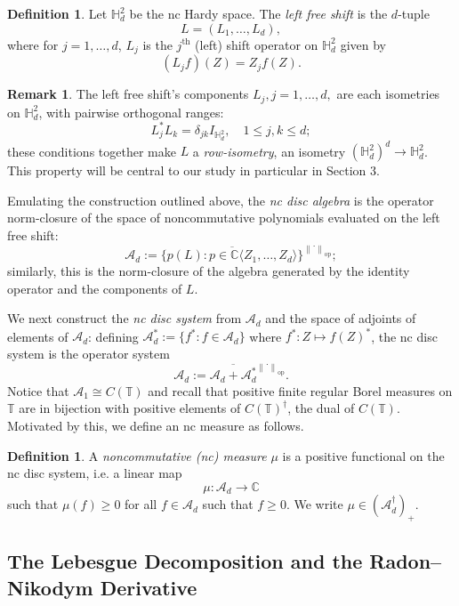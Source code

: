 \documentclass[11pt,reqno]{amsart}
\newcommand\norm[1]{\left\lVert#1\right\rVert}
\newcommand\ncm[1]{(\mathscr{A}_{#1}^{\dagger})_+}
\def\d{\delta}
\def\CC{\mathbb{C}}
\def\TT{\mathbb{T}}
\def\HH{\mathbb{H}}
\def\cA{\mathcal{A}}
\def\scrA{\mathscr{A}}
\theoremstyle{definition}
\newtheorem{definition}[theorem]{Definition}
\newtheorem{remark}[theorem]{Remark}
\numberwithin{equation}{section}
\begin{document}
\begin{definition}
    \label{def:LeftShift}
    Let \(\HH^2_d\) be the nc Hardy space. The \emph{left free shift} is the \(d\)-tuple
    \[
        L = (L_1, \ldots, L_d),
    \]
    where for \(j = 1, \ldots, d\), \(L_j\) is the \(j^{\text{th}}\) (left) shift operator on \(\HH^2_d\) given by
    \[
        (L_j f)(Z) = Z_j f(Z).
    \]
\end{definition}

\begin{remark}
    The left free shift's components \(L_j, j = 1, \ldots, d,\) are each isometries on \(\HH_d^2\), with pairwise orthogonal ranges:
    \[
        L_j^* L_k = \d_{jk} I_{\HH^2_d}, \quad 1 \leq j,k \leq d;
    \]
    these conditions together make \(L\) a \emph{row-isometry}, an isometry \((\HH^2_d)^d \to \HH^2_d\). This property will be central to our study in particular in Section 3.
\end{remark}

Emulating the construction outlined above, the \emph{nc disc algebra} is the operator norm-closure of the space of noncommutative polynomials evaluated on the left free shift:
\[
    \cA_d := \overline{\{p(L) : p \in \CC\langle Z_1, \ldots, Z_d \rangle\}}^{\norm{\cdot}_{\mathrm{op}}};
\]
similarly, this is the norm-closure of the algebra generated by the identity operator and the components of \(L\).

We next construct the \emph{nc disc system} from \(\cA_d\) and the space of adjoints of elements of \(\cA_d\): defining \(\cA_d^* := \{f^* : f \in \cA_d\}\) where \(f^* : Z \mapsto f(Z)^*\), the nc disc system is the operator system
\[
    \scrA_d := \overline{\cA_d + \cA_d^*}^{\norm{\cdot}_{\mathrm{op}}}.
\]
Notice that \(\scrA_1 \cong C(\TT)\) and recall that positive finite regular Borel measures on \(\TT\) are in bijection with positive elements of \(C(\TT)^{\dagger}\), the dual of \(C(\TT)\). Motivated by this, we define an nc measure as follows.

\begin{definition}
    \label{def:NCMeasure}
    A \emph{noncommutative (nc) measure} \(\mu\) is a positive functional on the nc disc system, i.e. a linear map
    \[
        \mu : \scrA_d \to \CC
    \] 
    such that \(\mu(f) \geq 0\) for all \(f \in \scrA_d\) such that \(f \geq 0\). We write \(\mu \in \ncm{d}\).
\end{definition}

\subsection{The Lebesgue Decomposition and the Radon--Nikodym Derivative}
\end{document}

